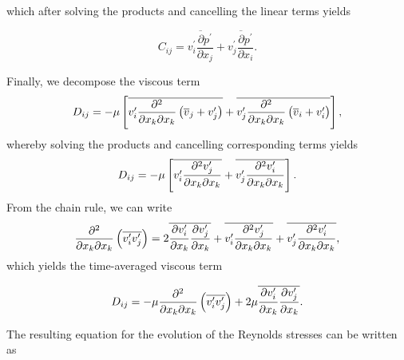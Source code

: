 which after solving the products and cancelling the linear terms yields
\begin{eqBox}
\begin{equation}
	C_{ij} =  
	\overline{v_i^\prime \frac{\partial p^\prime}{\partial x_j}}
	+\overline{v_j^\prime \frac{\partial p^\prime}{\partial x_i}}.
\end{equation}
\end{eqBox}
Finally, we decompose the viscous term
\begin{equation}
	D_{ij} = -\mu \left[ 
	  \overline{v_i^\prime \frac{\partial^2}{\partial x_k\partial x_k} \left(\overline v_j + v_j^\prime\right)}
	+ \overline{v_j^\prime \frac{\partial^2}{\partial x_k\partial x_k} \left(\overline v_i + v_{i\vphantom{j}}^\prime\right)}
	\right],
\end{equation}
whereby solving the products and cancelling corresponding terms yields
\begin{equation}
	D_{ij} = -\mu \left[ 
	  \overline{v_i^\prime \frac{\partial^2 v_j^\prime}{\partial x_k\partial x_k}}
	+ \overline{v_j^\prime \frac{\partial^2 v_{i\vphantom{j}}^\prime }{\partial x_k\partial x_k}}
	\right].
\end{equation}
From the chain rule, we can write
\begin{equation}
	\frac{\partial^2}{\partial x_k \partial x_k} \left(\overline{v_i^\prime v_j^\prime} \right) 
	= 2\overline{\frac{\partial v_{i\vphantom{j}}^\prime}{\partial x_k}\frac{\partial v_j^\prime}{\partial x_k}}
	+ \overline{v_i^\prime \frac{\partial^2 v_j^\prime}{\partial x_k\partial x_k}}
	+ \overline{v_j^\prime \frac{\partial^2 v_{i\vphantom{j}}^\prime}{\partial x_k\partial x_k}},
\end{equation}
which yields the time-averaged viscous term
\begin{eqBox}
\begin{equation}
	D_{ij} = -
	\mu \frac{\partial^2}{\partial x_k \partial x_k} \left(\overline{v_i^\prime v_j^\prime}\right) 
	+ 2 \mu \overline{\frac{\partial v_{i\vphantom{j}}^\prime}{\partial x_k}\frac{\partial v_j^\prime}{\partial x_k}}.
\end{equation}
\end{eqBox}
The resulting equation for the evolution of the Reynolds stresses can be written as
